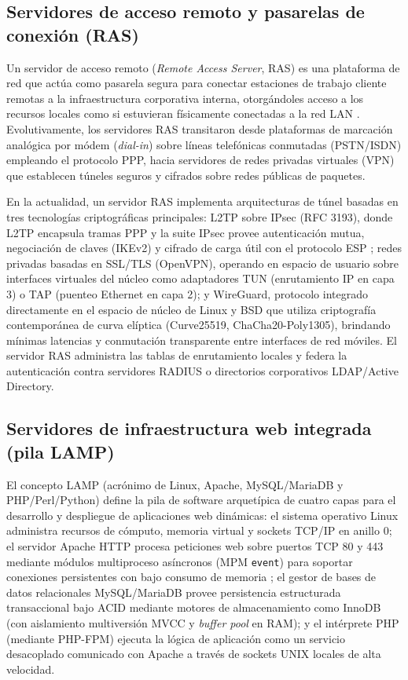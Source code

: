 \documentclass[12pt]{article}
\begin{document}
\subsection{Servidores de acceso remoto y pasarelas de conexión (RAS)}
\label{sec:servidoresRas}

Un servidor de acceso remoto (\textit{Remote Access Server}, RAS) es una plataforma de red que actúa como pasarela segura para conectar estaciones de trabajo cliente remotas a la infraestructura corporativa interna, otorgándoles acceso a los recursos locales como si estuvieran físicamente conectadas a la red LAN \parencite[\S 1, pp.\ 1--3]{rfc3193}. Evolutivamente, los servidores RAS transitaron desde plataformas de marcación analógica por módem (\textit{dial-in}) sobre líneas telefónicas conmutadas (PSTN/ISDN) empleando el protocolo PPP, hacia servidores de redes privadas virtuales (VPN) que establecen túneles seguros y cifrados sobre redes públicas de paquetes.

En la actualidad, un servidor RAS implementa arquitecturas de túnel basadas en tres tecnologías criptográficas principales: L2TP sobre IPsec (RFC 3193), donde L2TP encapsula tramas PPP y la suite IPsec provee autenticación mutua, negociación de claves (IKEv2) y cifrado de carga útil con el protocolo ESP \parencite[\S 4, pp.\ 7--10]{rfc3193}; redes privadas basadas en SSL/TLS (OpenVPN), operando en espacio de usuario sobre interfaces virtuales del núcleo como adaptadores TUN (enrutamiento IP en capa 3) o TAP (puenteo Ethernet en capa 2); y WireGuard, protocolo integrado directamente en el espacio de núcleo de Linux y BSD que utiliza criptografía contemporánea de curva elíptica (Curve25519, ChaCha20-Poly1305), brindando mínimas latencias y conmutación transparente entre interfaces de red móviles. El servidor RAS administra las tablas de enrutamiento locales y federa la autenticación contra servidores RADIUS o directorios corporativos LDAP/Active Directory.

\subsection{Servidores de infraestructura web integrada (pila LAMP)}
\label{sec:servidoresLamp}

El concepto LAMP (acrónimo de Linux, Apache, MySQL/MariaDB y PHP/Perl/Python) define la pila de software arquetípica de cuatro capas para el desarrollo y despliegue de aplicaciones web dinámicas: el sistema operativo Linux administra recursos de cómputo, memoria virtual y sockets TCP/IP en anillo 0; el servidor Apache HTTP procesa peticiones web sobre puertos TCP 80 y 443 mediante módulos multiproceso asíncronos (MPM \texttt{event}) para soportar conexiones persistentes con bajo consumo de memoria \parencite{apacheFoundation}; el gestor de bases de datos relacionales MySQL/MariaDB provee persistencia estructurada transaccional bajo ACID mediante motores de almacenamiento como InnoDB (con aislamiento multiversión MVCC y \textit{buffer pool} en RAM); y el intérprete PHP (mediante PHP-FPM) ejecuta la lógica de aplicación como un servicio desacoplado comunicado con Apache a través de sockets UNIX locales de alta velocidad.
\end{document}
